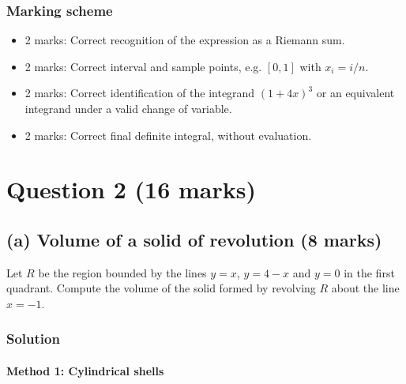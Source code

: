 \documentclass[12pt]{article}
\begin{document}
\subsubsection{Marking scheme}
\begin{itemize}
\item 2 marks: Correct recognition of the expression as a Riemann sum.
\item 2 marks: Correct interval and sample points, e.g. \([0,1]\) with \(x_i=i/n\).
\item 2 marks: Correct identification of the integrand \((1+4x)^3\) or an equivalent integrand under a valid change of variable.
\item 2 marks: Correct final definite integral, without evaluation.
\end{itemize}

\newpage

\section[Question 2 (16 marks)]{Question 2 \hfill (16 marks)}

\subsection{(a) Volume of a solid of revolution \hfill (8 marks)}

Let \(R\) be the region bounded by the lines \(y=x\), \(y=4-x\) and \(y=0\) in the first quadrant. Compute the volume of the solid formed by revolving \(R\) about the line \(x=-1\).

\subsubsection{Solution}

\paragraph{Method 1: Cylindrical shells}
\end{document}
